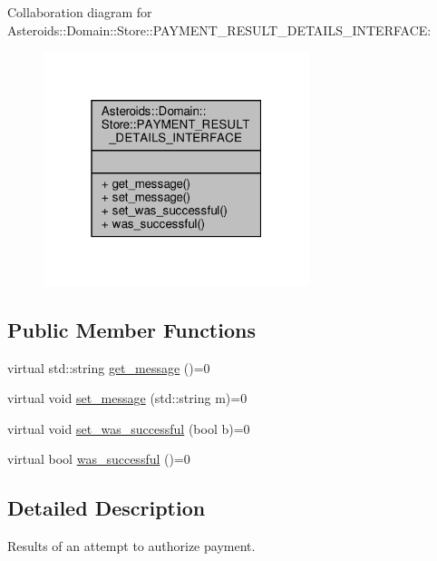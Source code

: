 Collaboration diagram for Asteroids\+:\+:Domain\+:\+:Store\+:\+:P\+A\+Y\+M\+E\+N\+T\+\_\+\+R\+E\+S\+U\+L\+T\+\_\+\+D\+E\+T\+A\+I\+L\+S\+\_\+\+I\+N\+T\+E\+R\+F\+A\+CE\+:\nopagebreak
\begin{figure}[H]
\begin{center}
\leavevmode
\includegraphics[width=220pt]{classAsteroids_1_1Domain_1_1Store_1_1PAYMENT__RESULT__DETAILS__INTERFACE__coll__graph}
\end{center}
\end{figure}
\subsection*{Public Member Functions}
\begin{DoxyCompactItemize}
\item 
virtual std\+::string \hyperlink{classAsteroids_1_1Domain_1_1Store_1_1PAYMENT__RESULT__DETAILS__INTERFACE_a2e8cac0ecf2e5b03781c82061006fcb5}{get\+\_\+message} ()=0
\item 
virtual void \hyperlink{classAsteroids_1_1Domain_1_1Store_1_1PAYMENT__RESULT__DETAILS__INTERFACE_a5aec143349a38f2c7a964eec84877877}{set\+\_\+message} (std\+::string m)=0
\item 
virtual void \hyperlink{classAsteroids_1_1Domain_1_1Store_1_1PAYMENT__RESULT__DETAILS__INTERFACE_a235066a3273f390f7a59ccfc2d0fd663}{set\+\_\+was\+\_\+successful} (bool b)=0
\item 
virtual bool \hyperlink{classAsteroids_1_1Domain_1_1Store_1_1PAYMENT__RESULT__DETAILS__INTERFACE_a94434f4fef8027eb4e9862043ee6521f}{was\+\_\+successful} ()=0
\end{DoxyCompactItemize}


\subsection{Detailed Description}
Results of an attempt to authorize payment. 


